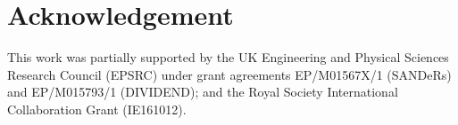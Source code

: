 \section{Acknowledgement}
This work was partially supported by the UK Engineering and Physical Sciences Research Council (EPSRC) under grant agreements EP/M01567X/1
(SANDeRs) and EP/M015793/1 (DIVIDEND); and the Royal Society International Collaboration Grant (IE161012).
